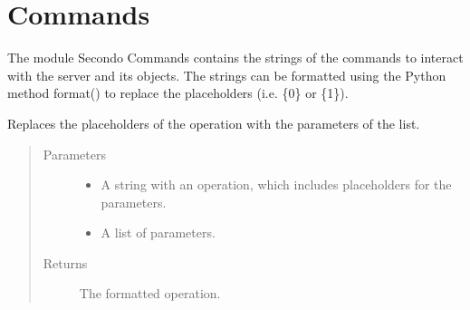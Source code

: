 \documentclass[letterpaper,10pt,english]{sphinxmanual}
\begin{document}
\section{ Commands}
\label{\detokenize{index:module-secondodb.api.support.secondocommands}}\label{\detokenize{index:sec-commands}}
The module Secondo Commands contains the strings of the commands to interact with the  server and its objects.
The strings can be formatted using the Python method format() to replace the placeholders (i.e. \{0\} or \{1\}).

\begin{fulllineitems}
\label{\detokenize{index:secondodb.api.support.secondocommands.apply_parameters_to_operation}}
Replaces the placeholders of the operation with the parameters of the list.
\begin{quote}\begin{description}
\item[{Parameters}] \leavevmode\begin{itemize}
\item {} 
 \textendash{} A string with an operation, which includes placeholders for the parameters.

\item {} 
 \textendash{} A list of parameters.

\end{itemize}

\item[{Returns}] \leavevmode
The formatted operation.

\end{description}\end{quote}

\end{fulllineitems}
\end{document}
